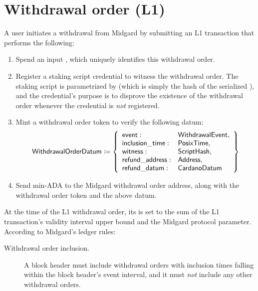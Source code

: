 \documentclass[../midgard.tex]{subfiles}
\begin{document}
\section{Withdrawal order (L1)}
\label{h:withdrawal-order}

A user initiates a withdrawal from Midgard by submitting an L1 transaction that performs the following:
\begin{enumerate}
    \item Spend an input , which uniquely identifies this withdrawal order.
    \item Register a staking script credential to witness the withdrawal order.
      The staking script is parametrized by  (which is simply the hash of the serialized ), and the credential's purpose is to disprove the existence of the withdrawal order whenever the credential is \emph{not} registered.
    \item Mint a withdrawal order token to verify the following datum:
        \begin{equation*}
        \mathsf{WithdrawalOrderDatum} \coloneq \left\{
            \begin{array}{ll}
                \mathsf{event} : & \mathsf{WithdrawalEvent}, \\
                \mathsf{inclusion\_time} : & \mathsf{PosixTime}, \\
                \mathsf{witness} : & \mathsf{ScriptHash}, \\
                \mathsf{refund\_address}: & \mathsf{Address}, \\
                \mathsf{refund\_datum}: & \mathsf{CardanoDatum}
            \end{array}
            \right\}
        \end{equation*}
    \item Send min-ADA to the Midgard withdrawal order address, along with the withdrawal order token and the above datum.
\end{enumerate}

At the time of the L1 withdrawal order, its  is set to the sum of the L1 transaction's validity interval upper bound and the  Midgard protocol parameter.
According to Midgard's ledger rules:
\begin{description}
    \item[Withdrawal order inclusion.] A block header must include withdrawal orders with inclusion times falling within the block header's event interval, and it must \emph{not} include any other withdrawal orders.
\end{description}
\end{document}
